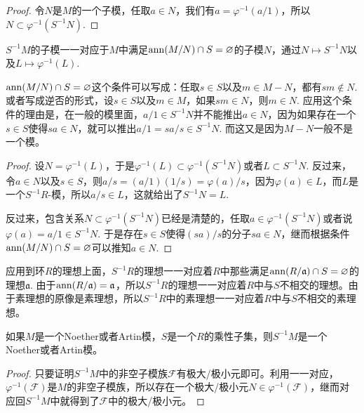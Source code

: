 
\begin{proof}
	令$N$是$M$的一个子模，任取$a\in N$，我们有$a=\varphi^{-1}(a/1)$，所以$N\subset \varphi^{-1}(S^{-1}N)$. 
\end{proof}

\begin{pro}\label{pro:3.5.19}
$S^{-1}M$的子模一一对应于$M$中满足$\operatorname{ann}(M/N)\cap S=\varnothing$的子模$N$，通过$N\mapsto S^{-1}N$以及$L\mapsto \varphi^{-1}(L)$.
\end{pro}

$\operatorname{ann}(M/N)\cap S=\varnothing$这个条件可以写成：任取$s\in S$以及$m\in M-N$，都有$sm\not\in N$. 或者写成逆否的形式，设$s\in S$以及$m\in M$，如果$sm\in N$，则$m\in N$. 应用这个条件的理由是，在一般的模里面，$a/1\in S^{-1}N$并不能推出$a\in N$，因为如果存在一个$s\in S$使得$sa\in N$，就可以推出$a/1=sa/s\in S^{-1}N$. 而这又是因为$M-N$一般不是一个模。

\begin{proof}
	设$N=\varphi^{-1}(L)$，于是$\varphi^{-1}(L)\subset \varphi^{-1}(S^{-1}N)$或者$L\subset S^{-1}N$. 反过来，令$a\in N$以及$s\in S$，则$a/s=(a/1)(1/s)=\varphi(a)/s$，因为$\varphi(a)\in L$，而$L$是一个$S^{-1}R$-模，所以$a/s\in L$，这就给出了$S^{-1}N=L$.

	反过来，包含关系$N\subset \varphi^{-1}(S^{-1}N)$已经是清楚的，任取$a\in \varphi^{-1}(S^{-1}N)$或者说$\varphi(a)=a/1\in S^{-1}N$. 于是存在$s\in S$使得$(sa)/s$的分子$sa\in N$，继而根据条件$\operatorname{ann}(M/N)\cap S=\varnothing$可以推知$a\in N$. 
\end{proof}

应用到环$R$的理想上面，$S^{-1}R$的理想一一对应着$R$中那些满足$\operatorname{ann}(R/\mathfrak{a})\cap S=\varnothing$的理想$\mathfrak{a}$. 由于$\operatorname{ann}(R/\mathfrak{a})=\mathfrak{a}$，所以$S^{-1}R$的理想一一对应着$R$中与$S$不相交的理想。由于素理想的原像是素理想，所以$S^{-1}R$中的素理想一一对应着$R$中与$S$不相交的素理想。

\begin{pro}
如果$M$是一个Noether或者Artin模，$S$是一个$R$的乘性子集，则$S^{-1}M$是一个Noether或者Artin模。
\end{pro}

\begin{proof}
	只要证明$S^{-1}M$中的非空子模族$\mathcal{F}$有极大/极小元即可。利用一一对应，$\varphi^{-1}(\mathcal{F})$是$M$的非空子模族，所以存在一个极大/极小元$N\in \varphi^{-1}(\mathcal{F})$，继而对应回$S^{-1}M$中就得到了$\mathcal{F}$中的极大/极小元。
\end{proof}

